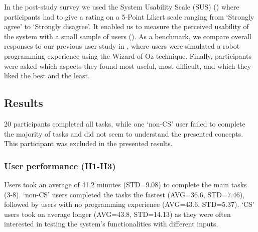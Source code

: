 In the post-study survey we used the System Usability Scale (SUS) (\cite{brooke1996sus}) where participants had to give a rating on a 5-Point Likert scale ranging from `Strongly agree' to `Strongly disagree'.
It enabled us to measure the perceived usability of the system with a small sample of users (\cite{tullis2004comparison}).
As a benchmark, we compare overall responses to our previous user study in , where users were simulated a robot programming experience using the Wizard-of-Oz technique.
Finally, participants were asked which aspects they found most useful, most difficult, and which they liked the best and the least.



\subsection{Results}
20 participants completed all tasks, while one `non-CS' user failed to complete the majority of tasks and did not seem to understand the presented concepts.
This participant was excluded in the presented results.

\subsubsection{User performance (H1-H3)} 
Users took an average of 41.2 minutes (STD=9.08) to complete the main tasks (3-8).
`non-CS' users completed the tasks the fastest (AVG=36.6, STD=7.46), followed by users with no programming experience (AVG=43.6, STD=5.37).
`CS' users took on average longer (AVG=43.8, STD=14.13) as they were often interested in testing the system's functionalities with different inputs.

